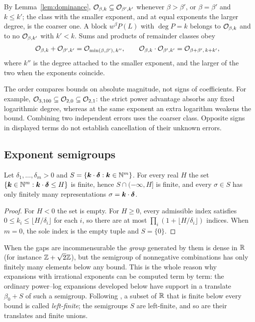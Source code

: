 By Lemma~\ref{lem:dominance}, $\mathcal O_{\beta,k}\subseteq\mathcal O_{\beta',k'}$ whenever $\beta>\beta'$, or $\beta=\beta'$ and $k\le k'$; the class with the smaller exponent, and at equal exponents the larger degree, is the coarser one. A block $w^\beta P(L)$ with $\deg P=k$ belongs to $\mathcal O_{\beta,k}$ and to no $\mathcal O_{\beta,k'}$ with $k'<k$. Sums and products of remainder classes obey
\begin{equation}
 \mathcal O_{\beta,k}+\mathcal O_{\beta',k'}=\mathcal O_{\min(\beta,\beta'),\,k''},\qquad
 \mathcal O_{\beta,k}\cdot\mathcal O_{\beta',k'}=\mathcal O_{\beta+\beta',\,k+k'},
 \label{eq:O-arithmetic}
\end{equation}
where $k''$ is the degree attached to the smaller exponent, and the larger of the two when the exponents coincide.

The order compares bounds on absolute magnitude, not signs of coefficients.
For example,
$\mathcal O_{3,100}\subseteq\mathcal O_{2,0}\subseteq\mathcal O_{2,1}$:
the strict power advantage absorbs any fixed logarithmic degree, whereas at
the same exponent an extra logarithm weakens the bound. Combining two
independent errors uses the coarser class. Opposite signs in displayed terms
do not establish cancellation of their unknown errors.

\subsection{Exponent semigroups}

\begin{lemma}
\label{lem:finite}
Let $\delta_1,\dots,\delta_m>0$ and $S=\{\boldsymbol k\cdot\boldsymbol\delta:\boldsymbol k\in\mathbb N^m\}$. For every real $H$ the set $\{\boldsymbol k\in\mathbb N^m:\boldsymbol k\cdot\boldsymbol\delta\le H\}$ is finite, hence $S\cap(-\infty,H]$ is finite, and every $\sigma\in S$ has only finitely many representations $\sigma=\boldsymbol k\cdot\boldsymbol\delta$.
\end{lemma}
\begin{proof}
For $H<0$ the set is empty. For $H\ge0$, every admissible index satisfies
$0\le k_i\le\lfloor H/\delta_i\rfloor$ for each $i$, so there are at
most $\prod_i(1+\lfloor H/\delta_i\rfloor)$ indices. When $m=0$,
the sole index is the empty tuple and $S=\{0\}$.
\end{proof}

When the gaps are incommensurable the \emph{group} generated by them is dense in $\mathbb R$ (for instance $\mathbb Z+\sqrt2\mathbb Z$), but the semigroup of nonnegative combinations has only finitely many elements below any bound. This is the whole reason why expansions with irrational exponents can be computed term by term: the ordinary power--log expansions developed below have support in a translate $\beta_0+S$ of such a semigroup. Following \cite{proveit}, a subset of $\mathbb R$ that is finite below every bound is called \emph{left-finite}; the semigroups $S$ are left-finite, and so are their translates and finite unions.

